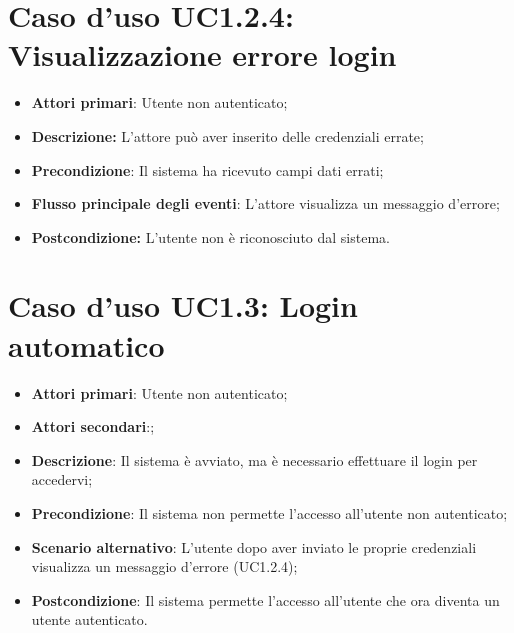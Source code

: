 	\section{Caso d'uso UC1.2.4: Visualizzazione errore login}
		\begin{itemize}
			\item \textbf{Attori primari}: Utente non autenticato;
			\item \textbf{Descrizione:} L'attore può aver inserito delle credenziali errate;
			\item \textbf{Precondizione}: Il sistema ha ricevuto campi dati errati;
			\item \textbf{Flusso principale degli eventi}: L'attore visualizza un messaggio d'errore;
			\item \textbf{Postcondizione:} L'utente non è riconosciuto dal sistema.
		\end{itemize}
	\section{Caso d'uso UC1.3: Login automatico}
	\begin{itemize}
		\item \textbf{Attori primari}: Utente non autenticato;
		\item \textbf{Attori secondari}:;
		\item \textbf{Descrizione}: Il sistema è avviato, ma è necessario effettuare il login per accedervi;
		\item \textbf{Precondizione}: Il sistema non permette l'accesso all'utente non autenticato;
		\item \textbf{Scenario alternativo}: L'utente dopo aver inviato le proprie credenziali visualizza un messaggio d'errore (UC1.2.4);
		\item \textbf{Postcondizione}: Il sistema permette l'accesso all'utente che ora diventa un utente autenticato.
		\end{itemize}
